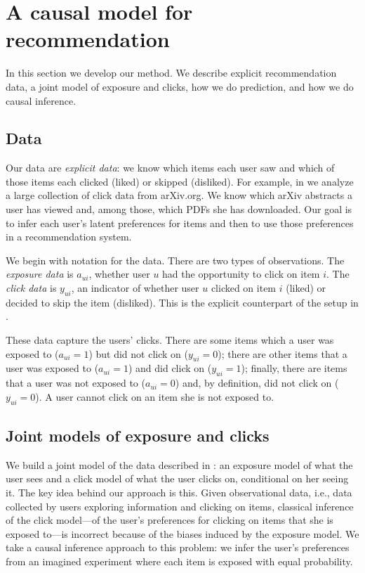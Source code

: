 
\section{A causal model for recommendation}

In this section we develop our method.  We describe explicit
recommendation data, a joint model of exposure and clicks, how we do
prediction, and how we do causal inference.

\subsection{Data}\label{chpt:causal_rec:sec:data}
Our data are \textit{explicit data}: we know which
items each user saw and which of those items each clicked (liked) or
skipped (disliked). For example, in  we analyze a large collection of click data from
arXiv.org. We know which arXiv abstracts a user has
viewed and, among those, which PDFs she has downloaded.  Our goal is
to infer each user's latent preferences for items and then to use
those preferences in a recommendation system.

We begin with notation for the data. There are two types of observations.  The
\textit{exposure data} is $a_{ui}$, whether user $u$ had the
opportunity to click on item $i$. The
\textit{click data} is $y_{ui}$, an indicator of whether user $u$
clicked on item $i$ (liked) or decided to skip the item (disliked). This is the explicit counterpart of the setup in .

These data capture the users' clicks.  There are some items which a
user was exposed to ($a_{ui} = 1$) but did not click on
($y_{ui} = 0$); there are other items that a user was exposed to
($a_{ui} = 1$) and did click on ($y_{ui} = 1$); finally, there are
items that a user was not exposed to ($a_{ui}=0$) and, by definition,
did not click on ($y_{ui} = 0$).  A user cannot click on an item she
is not exposed to.

\subsection{Joint models of exposure and clicks}
We build a joint model
of the data described in : an exposure model of what the user sees and a click
model of what the user clicks on, conditional on her seeing it.  The
key idea behind our approach is this.  Given observational data, i.e.,
data collected by users exploring information and clicking on items,
classical inference of the click model---of the user's preferences for
clicking on items that she is exposed to---is incorrect because of the
biases induced by the exposure model.  We take a causal inference
approach to this problem: we infer the user's preferences from an
imagined experiment where each item is exposed with equal probability.

